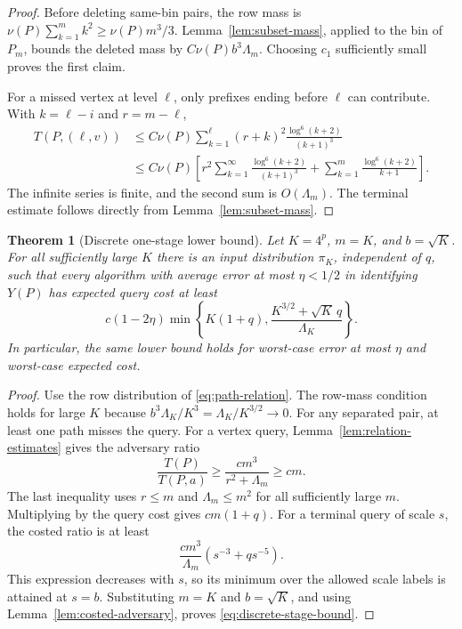 \documentclass[11pt,a4paper]{article}
\newtheorem{theorem}{Theorem}[section]
\theoremstyle{definition}
\theoremstyle{remark}
\begin{document}
\begin{proof}
Before deleting same-bin pairs, the row mass is
$\nu(P)\sum_{k=1}^m k^2\ge\nu(P)m^3/3$.
Lemma~\ref{lem:subset-mass}, applied to the bin of $P_m$, bounds the deleted
mass by $C\nu(P)b^3\Lambda_m$.  Choosing $c_1$ sufficiently small proves
the first claim.

For a missed vertex at level $\ell$, only prefixes ending before $\ell$
can contribute.  With $k=\ell-i$ and $r=m-\ell$,
\begin{align*}
 T(P,(\ell,v))
 &\le C\nu(P)\sum_{k=1}^{\ell}
        (r+k)^2\frac{\log^6(k+2)}{(k+1)^3}\\
 &\le C\nu(P)\left[
 r^2\sum_{k=1}^{\infty}\frac{\log^6(k+2)}{(k+1)^3}
 +\sum_{k=1}^m\frac{\log^6(k+2)}{k+1}\right].
\end{align*}
The infinite series is finite, and the second sum is $O(\Lambda_m)$.
The terminal estimate follows directly from Lemma~\ref{lem:subset-mass}.
\end{proof}

\begin{theorem}[Discrete one-stage lower bound]
\label{thm:one-stage-discrete}
Let $K=4^p$, $m=K$, and $b=\sqrt K$.  For all sufficiently large $K$ there
is an input distribution $\pi_K$, independent of $q$, such that every
algorithm with average error at most $\eta<1/2$ in identifying $Y(P)$ has
expected query cost at least
\begin{equation}
 c(1-2\eta)
 \min\left\{K(1+q),
       \frac{K^{3/2}+\sqrt K\,q}{\Lambda_K}\right\}.
 \label{eq:discrete-stage-bound}
\end{equation}
In particular, the same lower bound holds for worst-case error at most
$\eta$ and worst-case expected cost.
\end{theorem}

\begin{proof}
Use the row distribution of \eqref{eq:path-relation}.
The row-mass condition holds for large $K$ because
$b^3\Lambda_K/K^3=\Lambda_K/K^{3/2}\to0$.
For any separated pair, at least one path misses the query.  For a vertex
query, Lemma~\ref{lem:relation-estimates} gives the adversary ratio
\[
 \frac{T(P)}{T(P,a)}\ge
 \frac{cm^3}{r^2+\Lambda_m}\ge cm.
\]
The last inequality uses $r\le m$ and
$\Lambda_m\le m^2$ for all sufficiently large $m$.
Multiplying by the query cost gives $cm(1+q)$.
For a terminal query of scale $s$, the costed ratio is at least
\[
 \frac{cm^3}{\Lambda_m}
 \left(s^{-3}+q s^{-5}\right).
\]
This expression decreases with $s$, so its minimum over the allowed scale
labels is attained at $s=b$.  Substituting $m=K$ and $b=\sqrt K$, and using
Lemma~\ref{lem:costed-adversary}, proves \eqref{eq:discrete-stage-bound}.
\end{proof}
\end{document}
